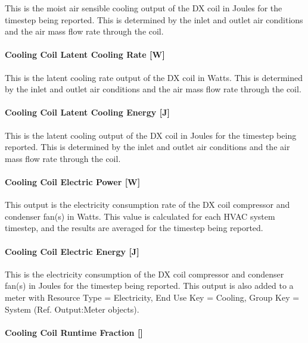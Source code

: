 This is the moist air sensible cooling output of the DX coil in Joules for the timestep being reported. This is determined by the inlet and outlet air conditions and the air mass flow rate through the coil.

\paragraph{Cooling Coil Latent Cooling Rate {[}W{]}}\label{cooling-coil-latent-cooling-rate-w-2}

This is the latent cooling rate output of the DX coil in Watts. This is determined by the inlet and outlet air conditions and the air mass flow rate through the coil.

\paragraph{Cooling Coil Latent Cooling Energy {[}J{]}}\label{cooling-coil-latent-cooling-energy-j-2}

This is the latent cooling output of the DX coil in Joules for the timestep being reported. This is determined by the inlet and outlet air conditions and the air mass flow rate through the coil.

\paragraph{Cooling Coil Electric Power {[}W{]}}\label{cooling-coil-electric-power-w}

This output is the electricity consumption rate of the DX coil compressor and condenser fan(s) in Watts. This value is calculated for each HVAC system timestep, and the results are averaged for the timestep being reported.

\paragraph{Cooling Coil Electric Energy {[}J{]}}\label{cooling-coil-electric-energy-j}

This is the electricity consumption of the DX coil compressor and condenser fan(s) in Joules for the timestep being reported. This output is also added to a meter with Resource Type = Electricity, End Use Key = Cooling, Group Key = System (Ref. Output:Meter objects).

\paragraph{\texorpdfstring{Cooling Coil Runtime Fraction {[]}}{Cooling Coil Runtime Fraction }}\label{cooling-coil-runtime-fraction-2}

